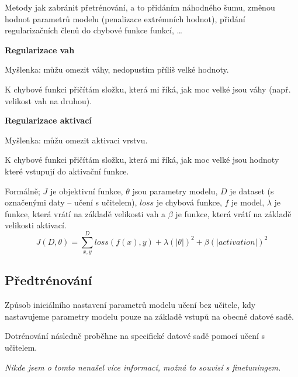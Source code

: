 \begin{compactitem}
    \item Metody jak zabránit přetrénování, a to přidáním náhodného šumu, změnou hodnot parametrů modelu (penalizace extrémních hodnot), přidání regularizačních členů do chybové funkce funkcí, \dots

    \item \textbf{Regularizace vah} \begin{compactitem}
        \item Myšlenka: můžu omezit váhy, nedopustím příliš velké hodnoty.
        \item K chybové funkci přičítám složku, která mi říká, jak moc velké jsou váhy (např. velikost vah na druhou).
    \end{compactitem}

    \item \textbf{Regularizace aktivací} \begin{compactitem}
        \item Myšlenka: můžu omezit aktivaci vrstvu.
        \item K chybové funkci přičítám složku, která mi říká, jak moc velké jsou hodnoty které vstupují do aktivační funkce.
    \end{compactitem}

    \item Formálně; $J$ je objektivní funkce, $\theta$ jsou parametry modelu, $D$ je dataset (s označenými daty -- učení s učitelem), $loss$ je chybová funkce, $f$ je model, $\lambda$ je funkce, která vrátí  na základě velikosti vah a $\beta$ je funkce, která vrátí  na základě velikosti aktivací.
    $$
        J(D, \theta) = \sum_{x, y}^D loss(f(x), y) + \lambda(|\theta|)^2 + \beta(|activation|)^2
    $$
\end{compactitem}

\subsection{Předtrénování}

\begin{compactitem}
    \item Způsob iniciálního nastavení parametrů modelu učení bez učitele, kdy nastavujeme parametry modelu pouze na základě vstupů na obecné datové sadě.

    \item Dotrénování následně proběhne na specifické datové sadě pomocí učení s učitelem.

    \item \textit{Nikde jsem o tomto nenašel více informací, možná to souvisí s finetuningem.}
\end{compactitem}

